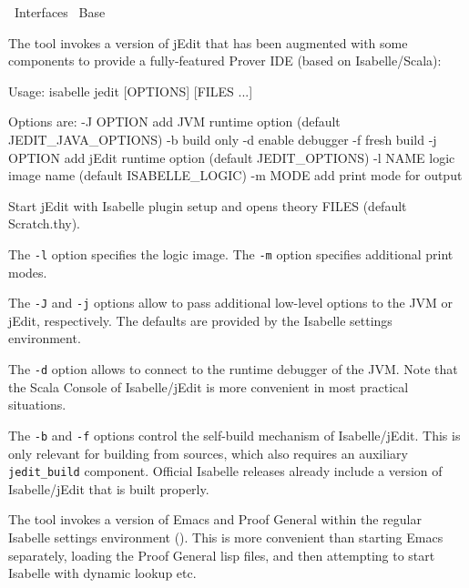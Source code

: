 %
\begin{isabellebody}%
\def\isabellecontext{Interfaces}%
%
\isadelimtheory
%
\endisadelimtheory
%
\isatagtheory
{}\isamarkupfalse%
\ Interfaces\isanewline
{}\ Base\isanewline
{}%
\endisatagtheory
{\isafoldtheory}%
%
\isadelimtheory
%
\endisadelimtheory
%
\isamarkuptrue%
%
\isamarkuptrue%
%
\begin{isamarkuptext}%
The \hypertarget{tool.jedit}{\hyperlink{tool.jedit}{\mbox{}}} tool invokes a version of jEdit that has
  been augmented with some components to provide a fully-featured
  Prover IDE (based on Isabelle/Scala):
\begin{ttbox}
Usage: isabelle jedit [OPTIONS] [FILES ...]

  Options are:
    -J OPTION    add JVM runtime option (default JEDIT_JAVA_OPTIONS)
    -b           build only
    -d           enable debugger
    -f           fresh build
    -j OPTION    add jEdit runtime option (default JEDIT_OPTIONS)
    -l NAME      logic image name (default ISABELLE_LOGIC)
    -m MODE      add print mode for output

Start jEdit with Isabelle plugin setup and opens theory FILES
(default Scratch.thy).
\end{ttbox}

  The \verb|-l| option specifies the logic image.  The
  \verb|-m| option specifies additional print modes.

  The \verb|-J| and \verb|-j| options allow to pass
  additional low-level options to the JVM or jEdit, respectively.  The
  defaults are provided by the Isabelle settings environment.

  The \verb|-d| option allows to connect to the runtime
  debugger of the JVM.  Note that the Scala Console of Isabelle/jEdit
  is more convenient in most practical situations.

  The \verb|-b| and \verb|-f| options control the
  self-build mechanism of Isabelle/jEdit.  This is only relevant for
  building from sources, which also requires an auxiliary \verb|jedit_build| component.  Official Isabelle releases already include
  a version of Isabelle/jEdit that is built properly.%
\end{isamarkuptext}%
\isamarkuptrue%
%
\isamarkuptrue%
%
\begin{isamarkuptext}%
The \hypertarget{tool.emacs}{\hyperlink{tool.emacs}{\mbox{}}} tool invokes a version of Emacs and
  Proof General \cite{proofgeneral} within the regular Isabelle
  settings environment ().  This is more
  convenient than starting Emacs separately, loading the Proof General
  lisp files, and then attempting to start Isabelle with dynamic
  \hyperlink{setting.PATH}{\mbox{}} lookup etc.


\end{isamarkuptext}
\end{isabellebody}
